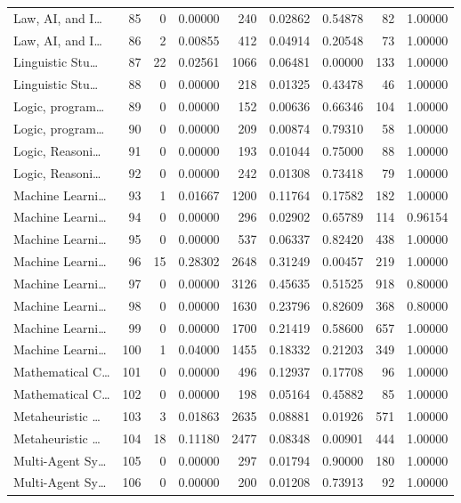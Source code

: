 \begin{table}
\begin{tabular}{lrrrrrrrr}
Law, AI, and I… & 85 & 0 & 0.00000 & 240 & 0.02862 & 0.54878 & 82 & 1.00000 \\
Law, AI, and I… & 86 & 2 & 0.00855 & 412 & 0.04914 & 0.20548 & 73 & 1.00000 \\
Linguistic Stu… & 87 & 22 & 0.02561 & 1066 & 0.06481 & 0.00000 & 133 & 1.00000 \\
Linguistic Stu… & 88 & 0 & 0.00000 & 218 & 0.01325 & 0.43478 & 46 & 1.00000 \\
Logic, program… & 89 & 0 & 0.00000 & 152 & 0.00636 & 0.66346 & 104 & 1.00000 \\
Logic, program… & 90 & 0 & 0.00000 & 209 & 0.00874 & 0.79310 & 58 & 1.00000 \\
Logic, Reasoni… & 91 & 0 & 0.00000 & 193 & 0.01044 & 0.75000 & 88 & 1.00000 \\
Logic, Reasoni… & 92 & 0 & 0.00000 & 242 & 0.01308 & 0.73418 & 79 & 1.00000 \\
Machine Learni… & 93 & 1 & 0.01667 & 1200 & 0.11764 & 0.17582 & 182 & 1.00000 \\
Machine Learni… & 94 & 0 & 0.00000 & 296 & 0.02902 & 0.65789 & 114 & 0.96154 \\
Machine Learni… & 95 & 0 & 0.00000 & 537 & 0.06337 & 0.82420 & 438 & 1.00000 \\
Machine Learni… & 96 & 15 & 0.28302 & 2648 & 0.31249 & 0.00457 & 219 & 1.00000 \\
Machine Learni… & 97 & 0 & 0.00000 & 3126 & 0.45635 & 0.51525 & 918 & 0.80000 \\
Machine Learni… & 98 & 0 & 0.00000 & 1630 & 0.23796 & 0.82609 & 368 & 0.80000 \\
Machine Learni… & 99 & 0 & 0.00000 & 1700 & 0.21419 & 0.58600 & 657 & 1.00000 \\
Machine Learni… & 100 & 1 & 0.04000 & 1455 & 0.18332 & 0.21203 & 349 & 1.00000 \\
Mathematical C… & 101 & 0 & 0.00000 & 496 & 0.12937 & 0.17708 & 96 & 1.00000 \\
Mathematical C… & 102 & 0 & 0.00000 & 198 & 0.05164 & 0.45882 & 85 & 1.00000 \\
Metaheuristic … & 103 & 3 & 0.01863 & 2635 & 0.08881 & 0.01926 & 571 & 1.00000 \\
Metaheuristic … & 104 & 18 & 0.11180 & 2477 & 0.08348 & 0.00901 & 444 & 1.00000 \\
Multi-Agent Sy… & 105 & 0 & 0.00000 & 297 & 0.01794 & 0.90000 & 180 & 1.00000 \\
Multi-Agent Sy… & 106 & 0 & 0.00000 & 200 & 0.01208 & 0.73913 & 92 & 1.00000 \\

\end{tabular}
\end{table}
